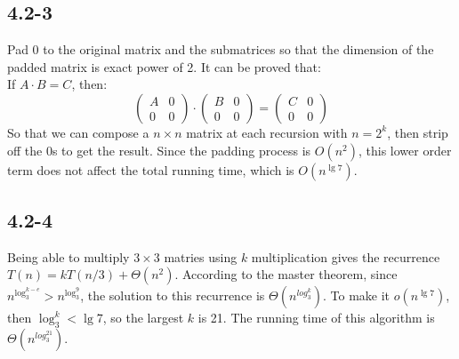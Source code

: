 \subsection{4.2-3}
    Pad 0 to the original matrix and the submatrices so that the dimension of
    the padded matrix is exact power of 2. It can be proved that: \\
    If $A\cdot B = C$, then:
    \begin{displaymath}
        \begin{pmatrix} A & 0 \\ 0 & 0 \end{pmatrix} \cdot
        \begin{pmatrix} B & 0 \\ 0 & 0 \end{pmatrix} =
        \begin{pmatrix} C & 0 \\ 0 & 0 \end{pmatrix}
    \end{displaymath}
    So that we can compose a $n \times n$ matrix at each recursion with $n =
    2^k$, then strip off the 0s to get the result. Since the padding process
    is $O(n^2)$, this lower order term does not affect the total running time,
    which is $O(n^{\lg 7})$.
\subsection{4.2-4}
    Being able to multiply $3 \times 3$ matries using $k$ multiplication gives
    the recurrence $T(n) = kT(n/3) + \Theta(n^2)$. According to the master
    theorem, since $n^{\log_3^{k-e}} > n^{\log_3^9}$, the solution to this
    recurrence is $\Theta(n^{log_3^k})$.  To make it $o(n^{\lg 7})$, then
    $\log_3^k < \lg 7$, so the largest $k$ is 21. The running time of this
    algorithm is $\Theta(n^{log_3^21})$.
